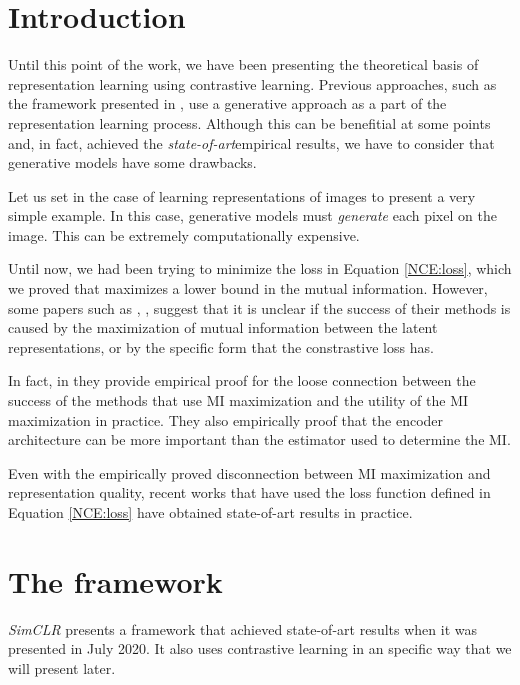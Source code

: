 \label{Chapter:SimCLR}
\section{Introduction}

Until this point of the work, we have been presenting the theoretical basis of representation learning using contrastive learning. Previous approaches, such as  the framework presented in \cite{oord_representation_2019}, use a generative approach as a part of the representation learning process. Although this can be benefitial at some points and, in fact, achieved the \emph{state-of-art}\footnotemark empirical results, we have to consider that generative models have some drawbacks. 



Let us set in the case of learning representations of images to present a very simple example. In this case, generative models must \emph{generate} each pixel on the image. This can be extremely computationally expensive. 

Until now, we had been trying to minimize the loss in Equation \eqref{NCE:loss}, which we proved that maximizes a lower bound in the mutual information. However, some papers such as \cite{chen_simple_2020}, \cite{tschannen_mutual_2020}, suggest that it is unclear if the success of their methods is caused by the maximization of mutual information between the latent representations, or by the specific form that the constrastive loss has.

In fact, in \cite{tschannen_mutual_2020} they provide empirical proof for the loose connection between the success of the methods that use MI maximization and the utility of the MI maximization in practice. They also empirically proof  that the encoder architecture can be more important than the estimator used to determine the MI.

Even with the empirically proved disconnection between MI maximization and representation quality, recent works that have used the loss function defined in Equation \eqref{NCE:loss} have obtained state-of-art results in practice. 

\section{The framework}

\emph{SimCLR} \citep{chen_simple_2020} presents a framework that achieved state-of-art results when it was presented in July 2020. It also uses contrastive learning in an specific way that we will present later. 

